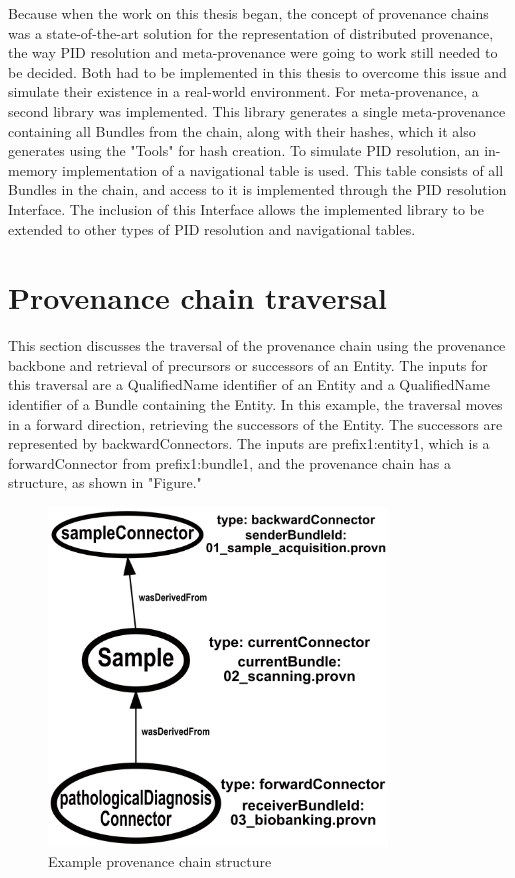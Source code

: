 \documentclass[
  digital,     %
  oneside,     %
  nosansbold,  %
  nocolorbold, %
  lof,         %
  lot,         %
]{fithesis4}
\begin{document}
Because when the work on this thesis began, the concept of provenance chains was a state-of-the-art solution for the representation of distributed provenance, the way PID resolution and meta-provenance were going to work still needed to be decided. Both had to be implemented in this thesis to overcome this issue and simulate their existence in a real-world environment. For meta-provenance, a second library was implemented. This library generates a single meta-provenance containing all Bundles from the chain, along with their hashes, which it also generates using the "Tools" for hash creation. To simulate PID resolution, an in-memory implementation of a navigational table is used. This table consists of all Bundles in the chain, and access to it is implemented through the PID resolution Interface. The inclusion of this Interface allows the implemented library to be extended to other types of PID resolution and navigational tables.
\shorthandon{-}

\section{Provenance chain traversal}
\shorthandoff{-}
This section discusses the traversal of the provenance chain using the provenance backbone and retrieval of precursors or successors of an Entity. The inputs for this traversal are a QualifiedName identifier of an Entity and a QualifiedName identifier of a Bundle containing the Entity. In this example, the traversal moves in a forward direction, retrieving the successors of the Entity. The successors are represented by backwardConnectors. The inputs are prefix1:entity1, which is a forwardConnector from prefix1:bundle1, and the provenance chain has a structure, as shown in "Figure."

\begin{figure}[htbp]
  \begin{center}
    \includegraphics[width=9cm]{fithesis/images/examplebigger.png}
  \end{center}
  \caption{Example provenance chain structure}
  \label{fig:bundleexample}
\end{figure}
\shorthandon{-}
\end{document}
